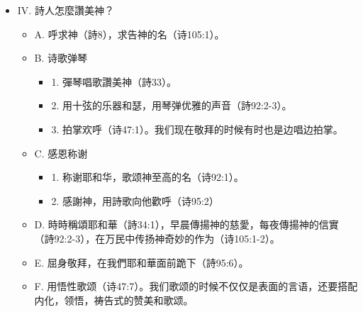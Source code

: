 \begin{itemize}
\begin{itemize}
\begin{itemize}
\item 4.	神打发他的僕人摩西和亞倫在敵人中行了很多神蹟（105:26-38）。
当摩西和亚伦带领百姓出埃及的时候，行了亚伦的杖变蛇，水变血之灾，蛙灾，虱灾，蝇灾，畜疫灾，疮灾，雹灾，蝗灾，黑暗之灾，杀长子之灾，最终带领百姓出了埃及（创7-11章）。
\item 5.	帶領百姓而出，雲彩遮蓋，夜間有火光照，時刻同在，並且供應生活所需的食物和水源（105:39-41）。
\end{itemize}
\item I.	看顾我们一生的神。
\begin{itemize}
\item 1.	从出母胎的时候被神扶持（诗71:6）。
\item 2.	年幼的时候，神是我们的依靠（诗71:5）。
\item 3.	年老的时候，力气衰弱的时候，不要离弃我（诗71：9）。
\item 4.	年老的时候依然栽于耶和华的殿中，发旺在神的院里（诗92:13-14）。
\end{itemize}
\item J.	赐给我们荣耀的神
\begin{itemize}
\item 1.	神使万民服在我们以下，叫列邦服在我们脚下（诗71:2-3）。
\item 2.	神使我们管理他手所造的牛羊，兽，鸟和鱼（诗8:6-8）。
\end{itemize}
\end{itemize}
\item IV.	詩人怎麼讚美神？
\begin{itemize}
\item A.	呼求神（詩8），求告神的名（诗105:1）。
\item B.	诗歌弹琴
\begin{itemize}
\item 1.	彈琴唱歌讚美神（詩33）。
\item 2.	用十弦的乐器和瑟，用琴弹优雅的声音（詩92:2-3）。
\item 3.	拍掌欢呼（诗47:1）。我们现在敬拜的时候有时也是边唱边拍掌。
\end{itemize}
\item C.	感恩称谢
\begin{itemize}
\item 1. 称谢耶和华，歌颂神至高的名（诗92:1）。
\item 2. 感謝神，用詩歌向他歡呼（诗95:2）
\end{itemize}
\item D.	時時稱頌耶和華（詩34:1），早晨傳揚神的慈愛，每夜傳揚神的信實（詩92:2-3），在万民中传扬神奇妙的作为（诗105:1-2）。
\item E.	屈身敬拜，在我們耶和華面前跪下（詩95:6）。
\item F.	用悟性歌颂（诗47:7）。我们歌颂的时候不仅仅是表面的言语，还要搭配内化，领悟，祷告式的赞美和歌颂。
\end{itemize}
\end{itemize}


